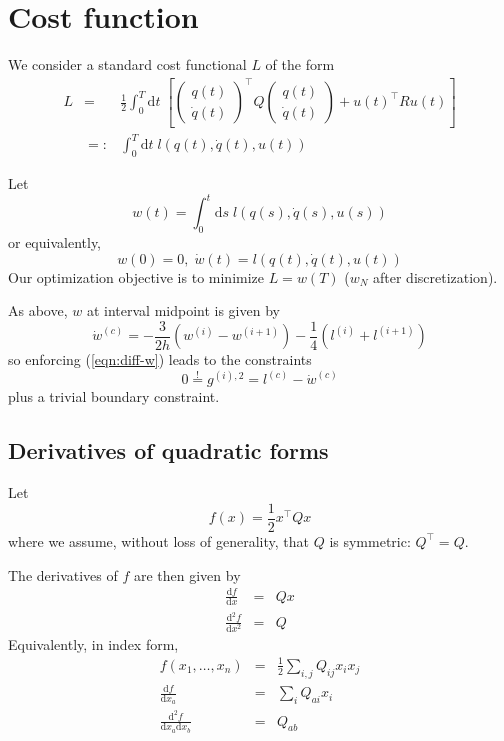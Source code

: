 \documentclass[a4paper]{article}
\begin{document}
\section{Cost function}
We consider a standard cost functional $L$ of the form
\begin{eqnarray}
L &=& \frac{1}{2} \int_0^T\mathrm{d}t\;\left[
\left(\begin{array}{cc}q(t)\\ \dot{q}(t)\end{array}\right)^\top
Q
\left(\begin{array}{cc}q(t)\\ \dot{q}(t)\end{array}\right)
+ u(t)^\top R u(t)
\right]\\
\nonumber &=:& \int_0^T\mathrm{d}t\; l(q(t), \dot{q}(t), u(t))
\end{eqnarray}

Let
\begin{equation}
w(t) = \int_0^t \mathrm{d}s\; l(q(s), \dot{q}(s), u(s))
\end{equation}
or equivalently,
\begin{equation}
\label{eqn:diff-w}
w(0) = 0,\;\dot{w}(t) = l(q(t), \dot{q}(t), u(t))
\end{equation}
Our optimization objective is to minimize $L = w(T)$ ($w_N$ after discretization).

As above, $w$ at interval midpoint is given by
\begin{equation}
\dot{w}^{(c)} = - \frac{3}{2h} (w^{(i)} - w^{(i+1)}) - \frac{1}{4}(l^{(i)} + l^{(i+1)})
\end{equation}
so enforcing (\ref{eqn:diff-w}) leads to the constraints
\begin{equation}
0 \stackrel{!}{=} g^{(i),2} = l^{(c)} - \dot{w}^{(c)}
\end{equation}
plus a trivial boundary constraint.

\subsection{Derivatives of quadratic forms}
Let
\begin{equation}
f(x) = \frac{1}{2} x^\top Q x
\end{equation}
where we assume, without loss of generality, that $Q$ is symmetric: $Q^\top = Q$.

The derivatives of $f$ are then given by
\begin{eqnarray}
\frac{\mathrm{d}f}{\mathrm{d}x} &=& Q x\\
\frac{\mathrm{d}^2 f}{\mathrm{d}x^2} &=& Q
\end{eqnarray}
Equivalently, in index form,
\begin{eqnarray}
f(x_1,\ldots,x_n) &=& \frac{1}{2} \sum_{i,j} Q_{ij} x_i x_j\\
\frac{\mathrm{d}f}{\mathrm{d}x_a} &=& \sum_{i} Q_{ai} x_i\\
\frac{\mathrm{d}^2 f}{\mathrm{d}x_a \mathrm{d}x_b} &=& Q_{ab}
\end{eqnarray}
\end{document}
